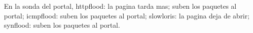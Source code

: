 En la sonda del portal, httpflood: la pagina tarda mas; suben los paquetes al portal; icmpflood: suben los paquetes al portal; slowloris: la pagina deja de abrir; synflood: suben los paquetes al portal.
